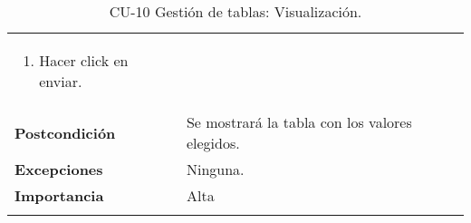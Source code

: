 \begin{longtable}[H]{@{}ll@{}}
\begin{minipage}[t]{0.71\columnwidth}
\begin{enumerate}
\item
Hacer click en enviar.
\end{enumerate}\strut
\end{minipage}\tabularnewline
\begin{minipage}[t]{0.23\columnwidth}\raggedright\strut
\textbf{Postcondición}\strut
\end{minipage} & \begin{minipage}[t]{0.71\columnwidth}\raggedright\strut
Se mostrará la tabla con los valores elegidos.\strut
\end{minipage}\tabularnewline
\begin{minipage}[t]{0.23\columnwidth}\raggedright\strut
\textbf{Excepciones}\strut
\end{minipage} & \begin{minipage}[t]{0.71\columnwidth}\raggedright\strut
Ninguna. \strut
\end{minipage}\tabularnewline
\begin{minipage}[t]{0.23\columnwidth}\raggedright\strut
\textbf{Importancia}\strut
\end{minipage} & \begin{minipage}[t]{0.71\columnwidth}\raggedright\strut
Alta\strut
\end{minipage}\tabularnewline
\bottomrule
\caption{CU-10 Gestión de tablas: Visualización.}
\end{longtable}

